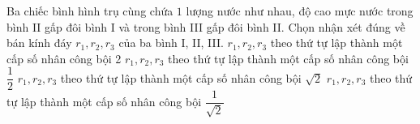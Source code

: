 \begin{ex}%
	Ba chiếc bình hình trụ cùng chứa $1$ lượng nước như nhau, độ cao mực nước trong bình II gấp đôi bình I và trong bình III gấp đôi bình II. Chọn nhận xét đúng về bán kính đáy $r_1,r_2,r_3$ của ba bình I, II, III.
	\choice
	{ $r_1,r_2,r_3$ theo thứ tự lập thành một cấp số nhân công bội 2}
	{ $r_1,r_2,r_3$ theo thứ tự lập thành một cấp số nhân công bội $\dfrac12$}
	{ $r_1,r_2,r_3$ theo thứ tự lập thành một cấp số nhân công bội $\sqrt{2}$}
	{ \True $r_1,r_2,r_3$ theo thứ tự lập thành một cấp số nhân công bội $\dfrac1{\sqrt{2}}$}
\end{ex}

